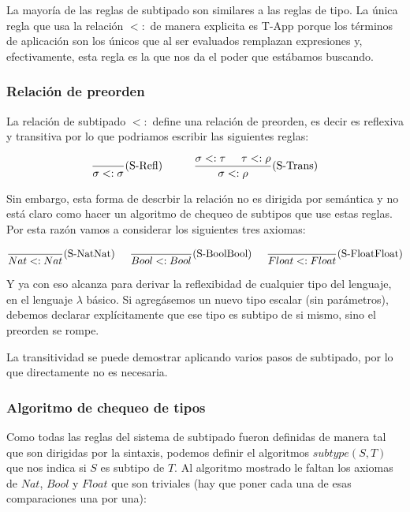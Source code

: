La mayoría de las reglas de subtipado son similares a las reglas de tipo. La  única regla que usa la relación $<:$ de manera explicita es T-App porque los términos de aplicación son los únicos que al ser evaluados remplazan expresiones y, efectivamente, esta regla es la que nos da el poder que estábamos buscando.


\subsubsection{Relación de preorden} La relación de subtipado $<:$ define una relación de preorden, es decir es reflexiva y transitiva por lo que podriamos escribir las siguientes reglas:

$$\frac{}{\sigma <: \sigma}(\text{S-Refl}) \hspace*{1cm}\frac{\sigma <:\tau\hspace*{5mm}\tau <: \rho}{\sigma <: \rho}(\text{S-Trans})$$

Sin embargo, esta forma de descrbir la relación no es dirigida por semántica y no está claro como hacer un algoritmo de chequeo de subtipos que use estas reglas. Por esta razón vamos a considerar los siguientes tres axiomas:

\begin{align*}
\frac{}{Nat <: Nat}(\text{S-NatNat}) \hspace*{5mm}\frac{}{Bool <: Bool}(\text{S-BoolBool}) \hspace*{5mm}\frac{}{Float <: Float}(\text{S-FloatFloat})
\end{align*}

\vspace*{5mm}
Y ya con eso alcanza para derivar la reflexibidad de cualquier tipo del lenguaje, en el lenguaje $\lambda$ básico. Si agregásemos un nuevo tipo escalar (sin parámetros),  debemos declarar explícitamente que ese tipo es subtipo de si mismo, sino el preorden se rompe.

La transitividad se puede demostrar aplicando varios pasos de subtipado, por lo que directamente no es necesaria.

\subsubsection{Algoritmo de chequeo de tipos}
Como todas las reglas del sistema de subtipado fueron definidas de manera tal que son dirigidas por la sintaxis, podemos definir el algoritmos $subtype(S,T)$ que nos indica si $S$ es subtipo de $T$. Al algoritmo mostrado le faltan los axiomas de $Nat$, $Bool$ y $Float$ que son triviales (hay que poner cada una de esas comparaciones una por una):

